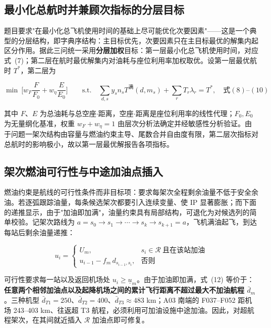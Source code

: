 \documentclass[zihao=-4,a4paper]{ctexart}
\begin{document}
\subsection{最小化总航时并兼顾次指标的分层目标}

题目要求"在最小化总飞机使用时间的基础上尽可能优化次要因素"——这是一个典型的分层结构，即字典序结构：主目标优先，次要因素只在主目标最优的解集内起区分作用。据此三问统一采用\textbf{分层加权}目标：第一层最小化总飞机使用时间，对应式~(7)；第二层在航时最优解集内对油耗与座位利用率加权取优。设第一层最优航时 $T^*$，第二层为

\begin{equation}
  \min\ \Big[w_F\frac{F}{F_0}+w_\eta\frac{E}{E_0}\Big]
  \qquad\text{s.t.}\quad \sum_{d,s}y_s n_s T^{\text{满}}(d,m_s)+\sum_r T_r\lambda_r=T^*,\quad \text{式}(8)\text{--}(10)
\end{equation}

其中 $F$、$E$ 为总油耗与总空座$\cdot$距离，空座$\cdot$距离是座位利用率的线性代理；$F_0,E_0$ 为无量纲化基准，权重 $w_F+w_\eta=1$ 由层次分析法确定并经敏感性分析验证。由于问题一架次结构由容量与燃油约束主导、尾数合并自由度有限，第二层次指标对总航时的影响极小，故以第一层最优解报告各项指标。

\subsection{架次燃油可行性与中途加油点插入}

燃油约束是航线的可行性条件而非目标项：要求每架次全程剩余油量不低于安全余油。若逐弧跟踪油量，每条候选架次都要引入连续变量、使 IP 显著膨胀；而下面的递推显示，由于"加油即加满"，油量约束具有局部结构，可退化为对候选列的简单校验。记架次路线为 $a=s_0\to s_1\to\cdots\to s_k\to s_{k+1}=a$，飞机满油起飞，到达每站后剩余油量递推：

\begin{equation}
  u_i=\begin{cases}
    U_m, & s_i\in\mathcal{R}\ \text{且在该站加油}\\
    u_{i-1}-f_m\,d_{s_{i-1},s_i}, & \text{否则}
  \end{cases}
\end{equation}

可行性要求每一站以及返回机场处 $u_i\ge\underline{u}_m$。由于加油即加满，式~(12) 等价于：\textbf{任意两个相邻加油点以及起降机场之间的累计飞行距离不超过最大不加油航程 $\bar d_m$}。三种机型 $\bar d_{T1}=250$、$\bar d_{T2}=400$、$\bar d_{T3}\approx483$ km；A03 南端的 F037--F052 距机场 243--403 km、往返超 T3 航程，必须利用可加油设施中途加油。因此，对超航程架次，在其间就近插入 $\mathcal{R}$ 加油点即可修复。
\end{document}
